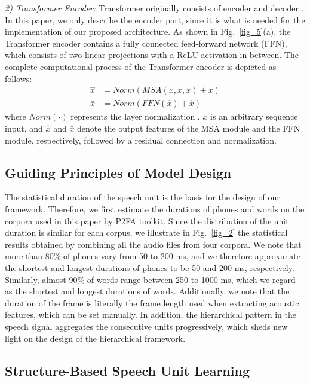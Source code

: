 \documentclass[lettersize,journal]{IEEEtran}
\begin{document}
\textit{2) Transformer Encoder:} Transformer originally consists of encoder and decoder \cite{Transformer}. In this paper, we only describe the encoder part, since it is what is  needed for the implementation of our proposed architecture. As shown in Fig.~\ref{fig_5}(a), the Transformer encoder contains a fully connected feed-forward network (FFN), which consists of two linear projections with a ReLU activation \cite{relu} in between. The complete computational  process of the Transformer encoder is depicted as follows:
\begin{align}
\hat{x} &= Norm(MSA(x, x, x) + x)\\
\bar{x} &= Norm(FFN(\hat{x}) + \hat{x})
\label{eq34}
\end{align}
where $Norm(\cdot)$ represents the layer normalization \cite{LN}, $x$ is an arbitrary sequence input, and $\hat{x}$ and $\bar{x}$ denote the output features of the MSA module and the FFN module, respectively, followed by a residual connection \cite{residual} and normalization.
\fi

\subsection{Guiding Principles of Model Design}
\label{statistics}
The statistical duration of the speech unit is the basis for the design of our framework.
Therefore, we first estimate the durations of phones and words on the corpora used in this paper by P2FA \cite{P2FA} toolkit. Since the distribution of the unit duration is similar for each corpus, we illustrate in Fig.~\ref{fig_2} the statistical results obtained by combining all the audio files from four corpora. We note that more than 80\% of phones vary from 50 to 200 ms, and we therefore approximate the shortest and longest durations of phones to be 50 and 200 ms, respectively. Similarly, almost 90\% of words range between 250 to 1000 ms, which we regard as the shortest and longest durations of words. Additionally, we note that the duration of the frame is literally the frame length used when extracting acoustic features, which can be set manually. In addition, the hierarchical pattern in the speech signal aggregates the consecutive units progressively, which sheds new light on the design of the hierarchical framework.

\subsection{Structure-Based Speech Unit Learning}
\end{document}
